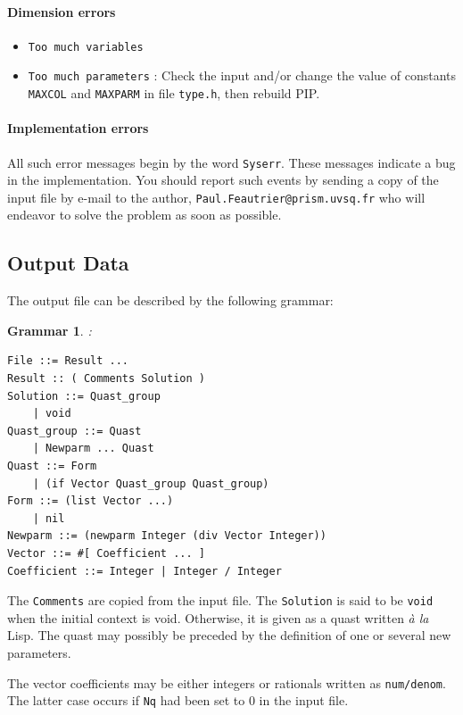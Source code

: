 \documentclass[12pt,a4paper]{article}
\newtheorem{grammar}{Grammar}
\begin{document}
\paragraph{Dimension errors}
\begin{itemize}
\item {\tt Too much variables}

\item {\tt Too much parameters} : Check the input and/or change the value of
constants {\tt MAXCOL} and {\tt MAXPARM} in file {\tt type.h}, then
rebuild PIP.
\end{itemize}
\paragraph{Implementation errors}

All such error messages begin by the word {\tt Syserr}. These messages
indicate a bug in the implementation. You should report such events
by sending a copy of the input file by e-mail to the author, \linebreak
{\tt Paul.Feautrier@prism.uvsq.fr} who will endeavor to solve the problem
as soon as possible.

\subsection{Output Data}\label{OutputData}
The output file can be described by the following grammar:
\begin{grammar}\label{GrammarOutputData}
:
\label{resultat}
\begin{verbatim}
File ::= Result ...
Result :: ( Comments Solution )
Solution ::= Quast_group
    | void
Quast_group ::= Quast
    | Newparm ... Quast
Quast ::= Form
    | (if Vector Quast_group Quast_group)
Form ::= (list Vector ...)
    | nil
Newparm ::= (newparm Integer (div Vector Integer))
Vector ::= #[ Coefficient ... ]
Coefficient ::= Integer | Integer / Integer
\end{verbatim}
\end{grammar}
The {\tt Comments} are copied from the input file. The {\tt Solution}
is said to be {\tt void} when the initial context is void. Otherwise,
it is given as a quast written {\sl \`a la} Lisp. The quast may
possibly be preceded by the definition of one or several new
parameters.

The vector coefficients may be either integers or rationals written as
{\tt num/denom}. The latter case occurs if {\tt Nq} had been
set to 0 in the input file.
\end{document}
